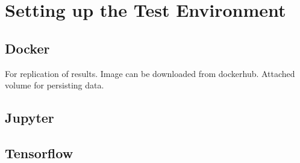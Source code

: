 \section{Setting up the Test Environment}
\subsection{Docker}
For replication of results. Image can be downloaded from dockerhub. Attached volume for persisting data.
\subsection{Jupyter}

\subsection{Tensorflow}

